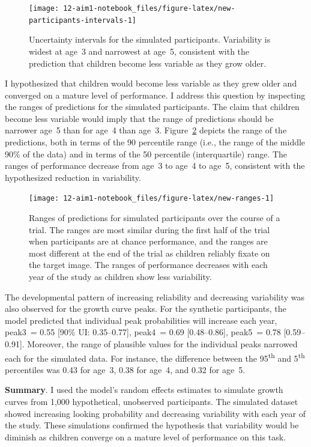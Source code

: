 \documentclass [11pt, proquest] {uwthesis}[2015/03/03]
\begin{document}
\begin{figure}
\texttt{[image: 12-aim1-notebook\_files/figure-latex/new-participants-intervals-1]} \caption{Uncertainty intervals for the simulated
participants. Variability is widest at age~3 and narrowest at age~5,
consistent with the prediction that children become less variable as
they grow older.}\label{fig:new-participants-intervals}
\end{figure}
I hypothesized that children would become less variable as they grew
older and converged on a mature level of performance. I address this
question by inspecting the ranges of predictions for the simulated
participants. The claim that children become less variable would imply
that the range of predictions should be narrower age~5 than for age~4
than age~3. Figure~\ref{fig:new-ranges} depicts the range of the
predictions, both in terms of the 90 percentile range (i.e., the range
of the middle 90\% of the data) and in terms of the 50 percentile
(interquartile) range. The ranges of performance decrease from age~3 to
age~4 to age~5, consistent with the hypothesized reduction in
variability.







\begin{figure}
\texttt{[image: 12-aim1-notebook\_files/figure-latex/new-ranges-1]} \caption{Ranges of predictions for simulated participants over
the course of a trial. The ranges are most similar during the first half
of the trial when participants are at chance performance, and the ranges
are most different at the end of the trial as children reliably fixate
on the target image. The ranges of performance decreases with each year
of the study as children show less variability.}\label{fig:new-ranges}
\end{figure}
The developmental pattern of increasing reliability and decreasing
variability was also observed for the growth curve peaks. For the
synthetic participants, the model predicted that individual peak
probabilities will increase each year, peak3~= 0.55 {[}90\% UI:
0.35--0.77{]}, peak4~= 0.69 {[}0.48--0.86{]}, peak5~= 0.78
{[}0.59--0.91{]}. Moreover, the range of plausible values for the
individual peaks narrowed each for the simulated data. For instance, the
difference between the 95\textsuperscript{th} and 5\textsuperscript{th}
percentiles was 0.43 for age~3, 0.38 for age~4, and 0.32 for age~5.

\textbf{Summary}. I used the model's random effects estimates to
simulate growth curves from 1,000 hypothetical, unobserved participants.
The simulated dataset showed increasing looking probability and
decreasing variability with each year of the study. These simulations
confirmed the hypothesis that variability would be diminish as children
converge on a mature level of performance on this task.
\end{document}
